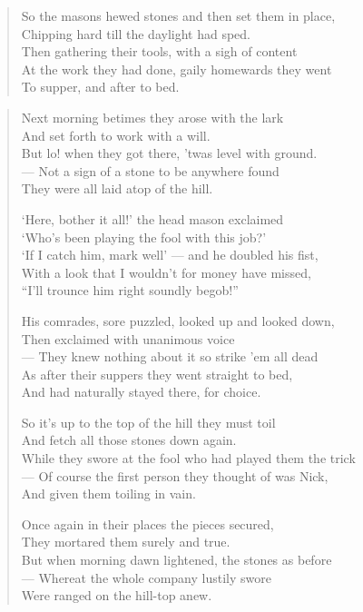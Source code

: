 \documentclass[
  12pt,
  a5paper,
  twoside]{book}
\begin{document}
\begin{quote}
So the masons hewed stones and then set them in place,\\
Chipping hard till the daylight had sped.\\
Then gathering their tools, with a sigh of content\\
At the work they had done, gaily homewards they went\\
To supper, and after to bed.
\end{quote}

\begin{quote}
Next morning betimes they arose with the lark\\
And set forth to work with a will.\\
But lo! when they got there, 'twas level with ground.\\
--- Not a sign of a stone to be anywhere found\\
They were all laid atop of the hill.

`Here, bother it all!' the head mason exclaimed\\
`Who's been playing the fool with this job?'\\
`If I catch him, mark well' --- and he doubled his fist,\\
With a look that I wouldn't for money have missed,\\
``I'll trounce him right soundly begob!''

His comrades, sore puzzled, looked up and looked down,\\
Then exclaimed with unanimous voice\\
--- They knew nothing about it so strike 'em all dead\\
As after their suppers they went straight to bed,\\
And had naturally stayed there, for choice.

So it's up to the top of the hill they must toil\\
And fetch all those stones down again.\\
While they swore at the fool who had played them the trick\\
--- Of course the first person they thought of was Nick,\\
And given them toiling in vain.

Once again in their places the pieces secured,\\
They mortared them surely and true.\\
But when morning dawn lightened, the stones as before\\
--- Whereat the whole company lustily swore\\
Were ranged on the hill-top anew.


\end{quote}
\end{document}
